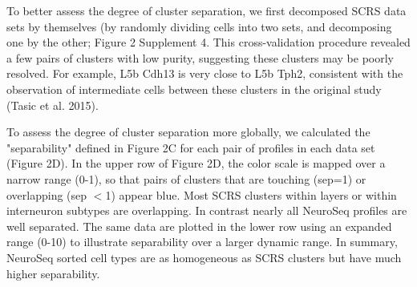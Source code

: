 To better assess the degree of cluster separation, we first decomposed SCRS data sets by themselves (by randomly dividing cells into two sets, and decomposing one by the other; Figure 2 Supplement 4. This cross-validation procedure revealed a few pairs of clusters with low purity, suggesting these clusters may be poorly resolved. For example, L5b Cdh13 is very close to L5b Tph2, consistent with the observation of intermediate cells between these clusters in the original study (Tasic et al. 2015).  

To assess the degree of cluster separation more globally, we calculated the "separability" defined in Figure 2C for each pair of profiles in each data set (Figure 2D). In the upper row of Figure 2D, the color scale is mapped over a narrow range (0-1), so that pairs of clusters that are touching (sep=1) or overlapping (sep $<$1) appear blue. Most SCRS clusters within layers or within interneuron subtypes are overlapping. In contrast nearly all NeuroSeq profiles are well separated. The same data are plotted in the lower row using an expanded range (0-10) to illustrate separability over a larger dynamic range. In summary, NeuroSeq sorted cell types are as homogeneous as SCRS clusters but have much higher separability. 

